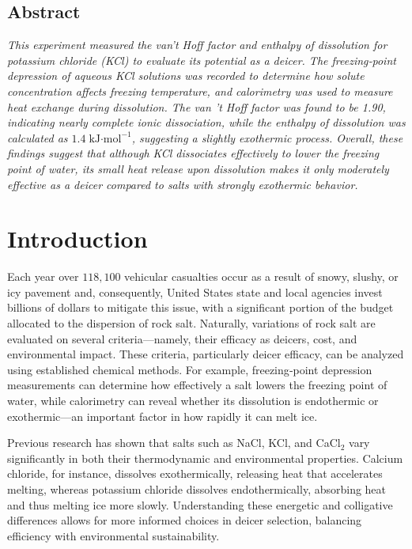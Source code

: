 \documentclass[11pt,letterpaper]{article}
\begin{document}
\MakeChemReportCoverPage

\begin{center}
\section*{\centering Abstract}
\begin{adjustwidth}{1.5cm}{1.5cm}
    \textit{This experiment measured the van’t Hoff factor and enthalpy of dissolution for potassium chloride (KCl) to evaluate its potential as a deicer. The freezing‐point depression of aqueous KCl solutions was recorded to determine how solute concentration affects freezing temperature, and calorimetry was used to measure heat exchange during dissolution. The van ’t Hoff factor was found to be 1.90, indicating nearly complete ionic dissociation, while the enthalpy of dissolution was calculated as $1.4\;\text{kJ·mol}^{-1}$, suggesting a slightly exothermic process. Overall, these findings suggest that although KCl dissociates effectively to lower the freezing point of water, its small heat release upon dissolution makes it only moderately effective as a deicer compared to salts with strongly exothermic behavior.}
\end{adjustwidth}
\end{center}

\section*{Introduction}

Each year over $118{,}100$ vehicular casualties occur as a result of snowy, slushy, or icy pavement and, consequently, United States state and local agencies invest billions of dollars to mitigate this issue, with a significant portion of the budget allocated to the dispersion of rock salt.\cite{ref1} Naturally, variations of rock salt are evaluated on several criteria—namely, their efficacy as deicers, cost, and environmental impact. These criteria, particularly deicer efficacy, can be analyzed using established chemical methods. For example, freezing‐point depression measurements can determine how effectively a salt lowers the freezing point of water, while calorimetry can reveal whether its dissolution is endothermic or exothermic—an important factor in how rapidly it can melt ice.

Previous research has shown that salts such as NaCl, KCl, and CaCl$_2$ vary significantly in both their thermodynamic and environmental properties. Calcium chloride, for instance, dissolves exothermically, releasing heat that accelerates melting, whereas potassium chloride dissolves endothermically, absorbing heat and thus melting ice more slowly.\cite{ref2} Understanding these energetic and colligative differences allows for more informed choices in deicer selection, balancing efficiency with environmental sustainability.
\end{document}
